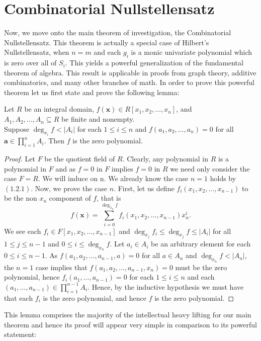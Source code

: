 	\section*{Combinatorial Nullstellensatz}
Now, we move onto the main theorem of investigation, the Combinatorial
Nullstellensatz. This theorem is actually a special case of Hilbert's Nullstellensatz, when \(n = m\) and each \(g_{i}\) is a monic univariate polynomial which is zero over all of \(S_{i}\). This yields a powerful generalization of the fundamental
theorem of algebra. This result is applicable in proofs from graph
theory, additive combinatorics, and many other branches of math.  In order to prove this powerful theorem let
		us first state and prove the following lemma: \begin{lemma}[]
			Let $R$ be an integral domain, $f\left( \textbf{x}
			\right) \in R[x_1, x_2, \ldots, x_{n}]$, and \\$A_1, A_2,
			\ldots, A_n \subseteq R$ be finite and nonempty.
			\\
			Suppose $\deg _{x_{i}} f < \left| A_i \right| $ for
			each $1\le i\le n$ and $f\left( a_1, a_2, \ldots, a_n
			\right) = 0$ for all \\ $ \textbf{a} \in \prod_{i= 1}^{n}
			A_i$. Then $f$ is the zero polynomial.  \end{lemma}
			\begin{proof}[Proof] Let  $F$ be the quotient field of
				$R$. Clearly, any polynomial in $R$ is a
				polynomial in $F$ and as $f=0$ in $F$ implies
				$f=0$ in $R$ we need only consider the case
				$F=R$. We will induce on n. We already know the case \(n=1\) holds by \(\left( 1.2.1 \right) \). Now, we prove the case $n$.
				First, let us define  $f_i \left( x_1, x_2,
				\ldots, x_{n-1} \right) $ to be the non \(x_{n}\) component of \(f\), that is \[f\left( \textbf{x} \right)  =
				\sum_{i=0}^{\deg _{x_{n}} f} f_i \left( x_1,
			x_2, \ldots, x_{n-1} \right)  x_n ^{i}.\]  We
			see each $f_i \in F[x_1, x_2, \ldots, x_{n-1}]$
				and $\deg_{x_{j}} f_i \le \deg _{x_{j}} f \le
				\left| A_i \right| $ for all $1 \le j \le n-1$
				and $0 \le i \le \deg _{x_{n}} f$. Let $a_i \in
				A_i$ be an arbitrary element for each \(0 \le i \le n - 1\).
				As $f\left( a_1, a_2, \ldots, a_{n-1}, a
				\right) = 0$ for all $a \in A_n$ and $\deg
				_{x_{n}} f < \left| A_n \right| $, the $n=1$
				case implies that $f\left( a_1, a_2, \ldots,
				a_{n-1}, x_{n} \right) = 0$ must be the zero
				polynomial, hence $f_i \left( a_1, \ldots,
				a_{n-1} \right) =0$ for each $1\le i \le n$ and each $
				\left( a_1, \ldots, a_{n-1} \right)  \in \prod_{i= 1}^{n-1} A_i$. Hence, by
			the inductive hypothesis we must have that
		each $f_i$ is the zero polynomial, and hence $f$ is the zero
	polynomial.  \end{proof} This lemma comprises the majority of the
	intellectual heavy lifting for our main theorem and hence its proof
	will appear very simple in comparison to its powerful statement:


